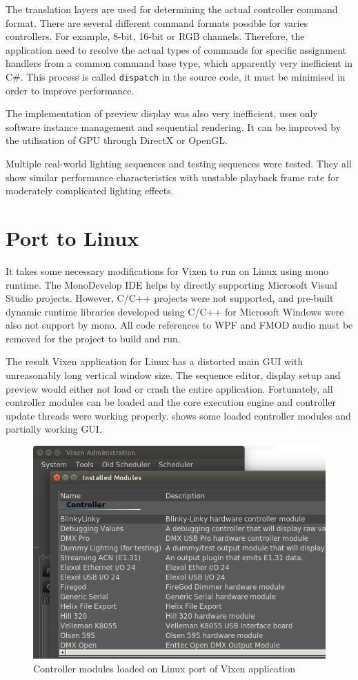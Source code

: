 The translation layers are used for determining the actual controller command format. There are several different command formats possible for varies controllers. For example, 8-bit, 16-bit or RGB channels. Therefore, the application need to resolve the actual types of commands for specific assignment handlers from a common command base type, which apparently very inefficient in C\#. This process is called \texttt{dispatch} in the source code, it must be minimised in order to improve performance. 

The implementation of preview display was also very inefficient, uses only software instance management and sequential rendering. It can be improved by the utilisation of GPU through DirectX or OpenGL.

Multiple real-world lighting sequences and testing sequences were tested. They all show similar performance characteristics with unstable playback frame rate for moderately complicated lighting effects.

\section{Port to Linux}

It takes some necessary modifications for Vixen to run on Linux using mono runtime. The MonoDevelop IDE \cite{monodevelop} helps by directly supporting Microsoft Visual Studio projects. However, C/C++ projects were not supported, and pre-built dynamic runtime libraries developed using C/C++ for Microsoft Windows were also not support by mono. All code references to WPF and FMOD audio must be removed for the project to build and run.

The result Vixen application for Linux has a distorted main GUI with unreasonably long vertical window size. The sequence editor, display setup and preview would either not load or crash the entire application. Fortunately, all controller modules can be loaded and the core execution engine and controller update threads were working properly.  shows some loaded controller modules and partially working GUI.

\begin{figure}[t]
  \centering
  \includegraphics[width=0.8\columnwidth]{Figs/vixen_linux_controllers.png}
  \caption{Controller modules loaded on Linux port of Vixen application}
  \label{fig:vixen_linux_main}
\end{figure}

